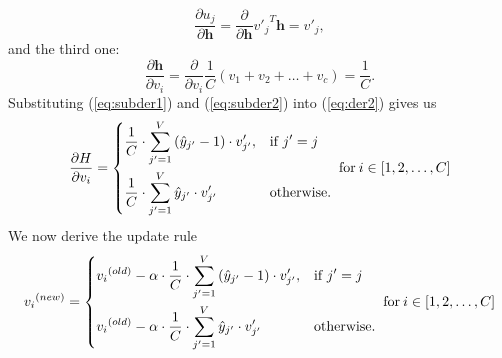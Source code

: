 \documentclass[english]{lni}
\begin{document}
\begin{equation}
    \label{eq:subder1}
    \frac{\partial u_{j}}{\partial \textbf{h}} = \frac{\partial}{\partial \textbf{h}}{v'_{j}}^{T}\textbf{h} = v'_{j},
\end{equation}
and the third one:
\begin{equation}
    \label{eq:subder2}
    \frac{\partial \textbf{h}}{\partial v_{i}} = \frac{\partial}{\partial v_{i}} \frac{1}{C}(v_1 + v_2 + \hdots + v_c) = \frac{1}{C}.
\end{equation}
Substituting (\ref{eq:subder1}) and (\ref{eq:subder2}) into (\ref{eq:der2}) gives us
\begin{equation}
\frac{\partial H}{\partial v_i} =
\begin{dcases}
    \frac{1}{C}\cdot \sum_{j' = 1}^{V}{(\hat{y}_{j'}-1)\cdot v'_{j'}},& \text{if } j'=j\\
    \frac{1}{C}\cdot \sum_{j' = 1}^{V}{\hat{y}_{j'}\cdot v'_{j'}} & \text{otherwise.}
\end{dcases}
\; \text{for} \: i \in [1, 2, \hdots, C]
\end{equation}
We now derive the update rule 
\begin{equation}
\label{eq:ctxder}
{v_{i}}^{(new)} = 
\begin{dcases}
    {v_{i}}^{(old)} - \alpha\cdot \frac{1}{C}\cdot \sum_{j' = 1}^{V}{(\hat{y}_{j'}-1)\cdot v'_{j'}},& \text{if } j'=j\\
    {v_{i}}^{(old)} - \alpha\cdot \frac{1}{C}\cdot \sum_{j' = 1}^{V}{\hat{y}_{j'}\cdot v'_{j'}} & \text{otherwise.}
\end{dcases}
\; \text{for} \: i \in [1, 2, \hdots, C]
\end{equation}
\end{document}
